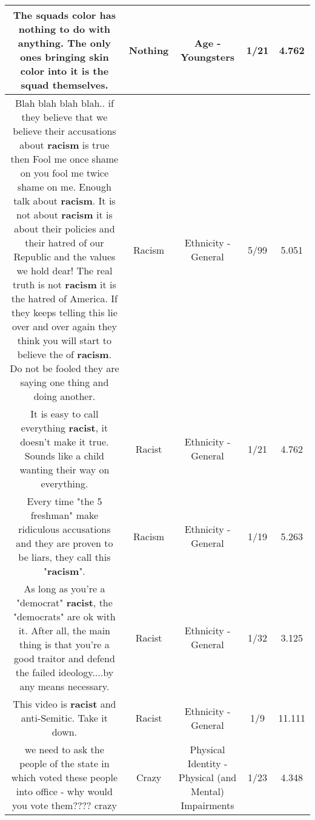 \documentclass[11pt]{article}
\newlength\mylength
\begin{document}
\begin{center}
\begin{longtable}{|C{.65\mylength}|C{.30\mylength}|C{.12\mylength}|C{.12\mylength}|C{.12\mylength}|}
  \small The squads color has \textbf{nothing} to do with anything.  The only ones bringing skin color into it is the squad themselves.\normalsize   & Nothing & Age - Youngsters & 1/21 & 4.762 \\  \hline
  \small Blah blah blah blah.. if they believe that we believe their accusations about \textbf{racism} is true then Fool me once shame on you fool me twice shame on me. Enough talk about \textbf{racism}. It is not about \textbf{racism} it is about their policies and their hatred of our Republic and the values we hold dear!  The real truth is not \textbf{racism} it is the hatred of America. If they keeps telling this lie over and over again they think you will start to believe the of \textbf{racism}. Do not be fooled they are saying one thing and doing another.\normalsize   & Racism & Ethnicity - General & 5/99 & 5.051 \\  \hline
  \small It is easy to call everything \textbf{racist}, it doesn't make it true. Sounds like a child wanting their way on everything.\normalsize   & Racist & Ethnicity - General & 1/21 & 4.762 \\  \hline
  \small Every time "the 5 freshman" make ridiculous accusations and they are proven to be liars, they call this "\textbf{racism}".\normalsize   & Racism & Ethnicity - General & 1/19 & 5.263 \\  \hline
  \small As long as you're a "democrat" \textbf{racist}, the "democrats" are ok with it. After all, the main thing is that you're a good traitor and defend the failed ideology....by any means necessary.\normalsize   & Racist & Ethnicity - General & 1/32 & 3.125 \\  \hline
  \small This video is \textbf{racist} and anti-Semitic. Take it down.\normalsize   & Racist & Ethnicity - General & 1/9 & 11.111 \\  \hline
  \small we need to ask the people of the state in which voted these people into office -   why would you vote them????  crazy\normalsize   & Crazy & Physical Identity - Physical (and Mental) Impairments & 1/23 & 4.348 \\  \hline

\end{longtable}
\end{center}
\end{document}
